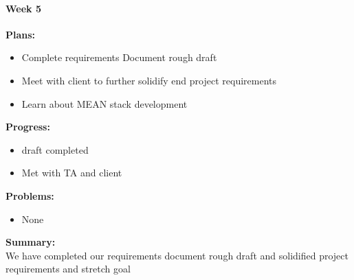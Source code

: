 \paragraph{Week 5}
\begin{adjustwidth}{2.5em}{0pt}
    \vspace{-0.5cm}\textbf{Plans:}
    \vspace{-0.5cm}
    \begin{itemize}
        \item Complete requirements Document rough draft
        \item Meet with client to further solidify end project requirements
        \item Learn about MEAN stack development 
    \end{itemize} 
    \vspace{-0.3cm}\textbf{Progress:}
    \vspace{-0.5cm}
    \begin{itemize}
        \item draft completed
        \item Met with TA and client
    \end{itemize} 
    \vspace{-0.3cm}\textbf{Problems:}
    \vspace{-0.5cm}
    \begin{itemize}
        \item None
    \end{itemize}  
    \vspace{-0.3cm}\noindent\textbf{Summary:}\\
    \noindent We have completed our requirements document rough draft and solidified project requirements and stretch goal
	\end{adjustwidth} 
